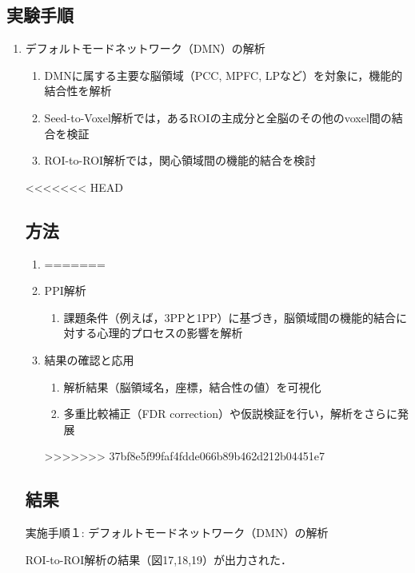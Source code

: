\documentclass{jlreq}
\begin{document}
\begin{enumerate}
\begin{enumerate}
\begin{enumerate}
\subsection{実験手順}
\begin{enumerate}
    \item デフォルトモードネットワーク（DMN）の解析
    \begin{enumerate}
        \item DMNに属する主要な脳領域（PCC, MPFC, LPなど）を対象に，機能的結合性を解析
        \item Seed-to-Voxel解析では，あるROIの主成分と全脳のその他のvoxel間の結合を検証
        \item ROI-to-ROI解析では，関心領域間の機能的結合を検討
    \end{enumerate}

<<<<<<< HEAD
\subsection{方法}
\begin{enumerate}
    \item 
=======
    \item PPI解析 
    \begin{enumerate}
        \item 課題条件（例えば，3PPと1PP）に基づき，脳領域間の機能的結合に対する心理的プロセスの影響を解析
    \end{enumerate}

    \item 結果の確認と応用
    \begin{enumerate}
        \item 解析結果（脳領域名，座標，結合性の値）を可視化
        \item 多重比較補正（FDR correction）や仮説検証を行い，解析をさらに発展
    \end{enumerate}
>>>>>>> 37bf8e5f99faf4fdde066b89b462d212b04451e7
\end{enumerate}
\subsection{結果}

実施手順１: デフォルトモードネットワーク（DMN）の解析  

ROI-to-ROI解析の結果（図17,18,19）が出力された．



\end{enumerate}
\end{enumerate}
\end{enumerate}
\end{enumerate}
\end{document}
